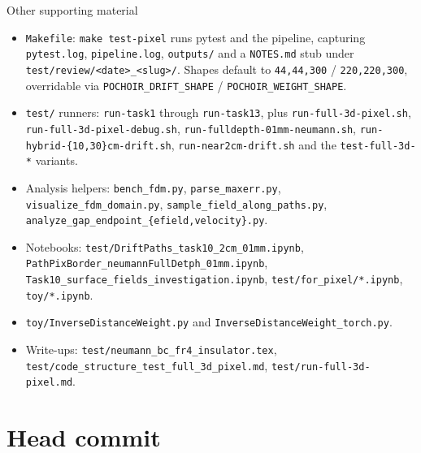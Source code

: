 \documentclass[10pt,aspectratio=169]{beamer}
\newcommand{\ti}[1]{\texttt{\footnotesize #1}}
\begin{document}
\begin{frame}[allowframebreaks]{Other supporting material}
  \begin{itemize}\small
  \item \ti{Makefile}: \ti{make test-pixel} runs pytest and the pipeline, capturing
        \ti{pytest.log}, \ti{pipeline.log}, \ti{outputs/} and a \ti{NOTES.md} stub under
        \ti{test/review/<date>\_<slug>/}. Shapes default to \ti{44,44,300} /
        \ti{220,220,300}, overridable via \ti{POCHOIR\_DRIFT\_SHAPE} /
        \ti{POCHOIR\_WEIGHT\_SHAPE}.
  \item \ti{test/} runners: \ti{run-task1} through \ti{run-task13}, plus
        \ti{run-full-3d-pixel.sh}, \ti{run-full-3d-pixel-debug.sh},
        \ti{run-fulldepth-01mm-neumann.sh}, \ti{run-hybrid-\{10,30\}cm-drift.sh},
        \ti{run-near2cm-drift.sh} and the \ti{test-full-3d-*} variants.
  \item Analysis helpers: \ti{bench\_fdm.py}, \ti{parse\_maxerr.py},
        \ti{visualize\_fdm\_domain.py}, \ti{sample\_field\_along\_paths.py},
        \ti{analyze\_gap\_endpoint\_\{efield,velocity\}.py}.
  \item Notebooks: \ti{test/DriftPaths\_task10\_2cm\_01mm.ipynb},
        \ti{PathPixBorder\_neumannFullDetph\_01mm.ipynb},
        \ti{Task10\_surface\_fields\_investigation.ipynb},
        \ti{test/for\_pixel/*.ipynb}, \ti{toy/*.ipynb}.
  \item \ti{toy/InverseDistanceWeight.py} and \ti{InverseDistanceWeight\_torch.py}.
  \item Write-ups: \ti{test/neumann\_bc\_fr4\_insulator.tex},
        \ti{test/code\_structure\_test\_full\_3d\_pixel.md},
        \ti{test/run-full-3d-pixel.md}.
  \end{itemize}
\end{frame}

\section{Head commit}
\end{document}
